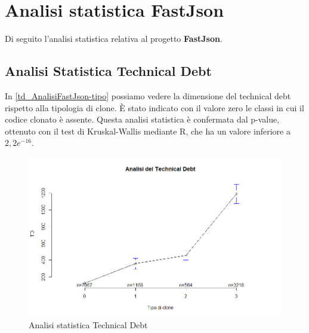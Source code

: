 \newpage
\section{Analisi statistica FastJson}
Di seguito l'analisi statistica relativa al progetto \textbf{FastJson}.

\subsection{Analisi Statistica Technical Debt}
In \autoref{td_AnalisiFastJson-tipo} possiamo vedere la dimensione del technical debt rispetto alla tipologia di clone. È stato indicato con il valore zero le classi in cui il codice clonato è assente. Questa analisi statistica è confermata dal p-value, ottenuto con il test di Kruskal-Wallis mediante R, che ha un valore inferiore a $2,2 e^{-16}$.
\begin{figure}[htbp]
	\centering
	\includegraphics[scale=0.5]{analisi_R/AnalisiFastJson/1-gplot-td-type.png}
\caption{Analisi statistica Technical Debt}
\label{td_AnalisiFastJson-tipo}
\end{figure}


